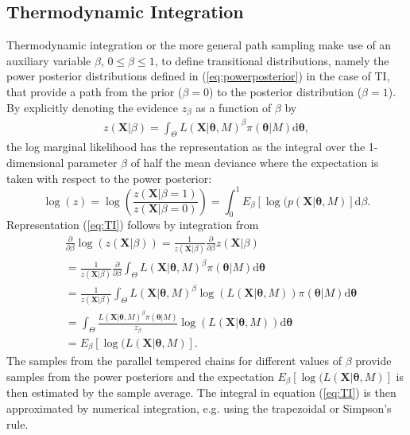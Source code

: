 \documentclass[aps,reprint,amsmath,amssymb,showpacs,showkeys]{revtex4-1}%
\begin{document}
\subsection{Thermodynamic Integration}
Thermodynamic integration  or the more general path sampling \citep{Gelman:1998} make use of an auxiliary variable $\beta$, $0\leq \beta \leq 1$, to
define transitional distributions, namely the power posterior distributions defined in (\ref{eq:powerposterior}) in the case of TI, that provide a path from the prior ($\beta=0$) to the posterior distribution ($\beta=1$). By explicitly denoting the evidence $z_\beta$ as a function of $\beta$ by
\begin{align}
z(\bm{X}|\beta)=\int_{\Theta} L(\bm{X}|\bm{\theta},M)^{\beta}\pi(\bm{\theta}|M) \text{d}\bm{\theta},
\end{align}
the log marginal likelihood has the representation as the integral over the 1-dimensional parameter $\beta$ of half the mean deviance where the expectation is taken with respect to the power posterior:
\begin{equation}\label{eq:TI}
\log(z)=\log\left( \frac{z(\bm{X}|\beta=1)}{z(\bm{X}|\beta=0)}\right)=\int_0^1 E_{\beta} \left[ \log(p(\bm{X}|\bm{\theta},M)\right]\text{d}\beta.
\end{equation}
Representation (\ref{eq:TI}) follows by integration from
\begin{align*}
&\frac{\partial}{\partial\beta} \log(z(\bm{X}|\beta)) = \frac{1}{z(\bm{X}|\beta)} \frac{\partial}{\partial\beta} z(\bm{X}|\beta)\\
&= \frac{1}{z(\bm{X}|\beta)} \frac{\partial}{\partial\beta}\int_{\Theta} L(\bm{X}|\bm{\theta},M)^{\beta}\pi(\bm{\theta}|M) \text{d}\bm{\theta}\\
&=  \frac{1}{z(\bm{X}|\beta)} \int_{\Theta}  L(\bm{X}|\bm{\theta},M)^{\beta}\log(L(\bm{X}|\bm{\theta},M)) \pi(\bm{\theta}|M) \text{d}\bm{\theta}\\
&=  \int_{\Theta}   \frac{L(\bm{X}|\bm{\theta},M)^{\beta}\pi(\bm{\theta}|M)}{z_{\beta}} \log(L(\bm{X}|\bm{\theta},M))\text{d}\bm{\theta}\\
&= E_{\beta} \left[ \log(L(\bm{X}|\bm{\theta},M)\right].
\end{align*}
The samples from the parallel tempered chains for different values of $\beta$ provide samples from the power posteriors and the
expectation $E_{\beta}\left[ \log(L(\bm{X}|\bm{\theta},M)\right]$ is then estimated by the sample average. The integral
in equation (\ref{eq:TI}) is then approximated by numerical integration, e.g. using the trapezoidal or Simpson's rule.
\end{document}

